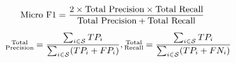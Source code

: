 \begin{equation}
    \small
    \begin{aligned}
        \text{Micro F1} = \frac{2 \times \text{Total Precision} \times \text{Total Recall}}{\text{Total Precision} + \text{Total Recall}}\quad\quad\quad\\[5pt]
        \substack{\text{Total} \\ \text{Precision}} = \frac{\sum_{i \in \mathcal{S}}  TP_{i}}{\sum_{i \in \mathcal{S}}( TP_{i} + FP_{i})}, 
        \substack{\text{Total} \\ \text{Recall}} = \frac{\sum_{i \in \mathcal{S}}  TP_{i}}{\sum_{i \in \mathcal{S}}(  TP_{i} +   FN_{i})}
    \end{aligned}
    \nonumber
\end{equation}
